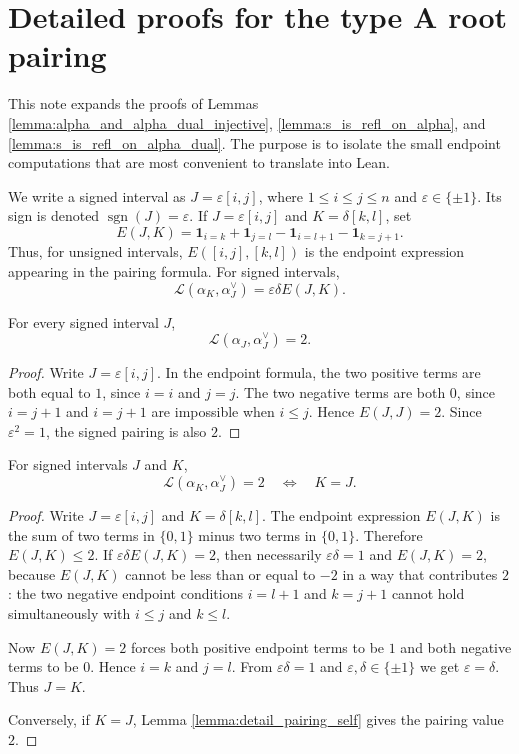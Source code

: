 
\section{Detailed proofs for the type A root pairing}

This note expands the proofs of Lemmas
\ref{lemma:alpha_and_alpha_dual_injective},
\ref{lemma:s_is_refl_on_alpha}, and
\ref{lemma:s_is_refl_on_alpha_dual}.  The purpose is to isolate the
small endpoint computations that are most convenient to translate into
Lean.

We write a signed interval as $J=\varepsilon [i,j]$, where
$1\le i\le j\le n$ and $\varepsilon\in\{\pm1\}$.  Its sign is denoted
$\operatorname{sgn}(J)=\varepsilon$.  If $J=\varepsilon[i,j]$ and
$K=\delta[k,l]$, set
\[
  E(J,K)
  =
  \mathbf{1}_{i=k}+\mathbf{1}_{j=l}
  -\mathbf{1}_{i=l+1}-\mathbf{1}_{k=j+1}.
\]
Thus, for unsigned intervals, $E([i,j],[k,l])$ is the endpoint expression
appearing in the pairing formula.  For signed intervals,
\[
  \mathcal L(\alpha_K,\alpha_J^\vee)
  =
  \varepsilon\delta E(J,K).
\]

\begin{lemma}\label{lemma:detail_pairing_self}
For every signed interval $J$,
\[
  \mathcal L(\alpha_J,\alpha_J^\vee)=2.
\]
\end{lemma}
\begin{proof}
Write $J=\varepsilon[i,j]$.  In the endpoint formula, the two positive
terms are both equal to $1$, since $i=i$ and $j=j$.  The two negative
terms are both $0$, since $i=j+1$ and $i=j+1$ are impossible when
$i\le j$.  Hence $E(J,J)=2$.  Since $\varepsilon^2=1$, the signed
pairing is also $2$.
\end{proof}

\begin{lemma}\label{lemma:detail_pairing_eq_two}
For signed intervals $J$ and $K$,
\[
  \mathcal L(\alpha_K,\alpha_J^\vee)=2
  \quad\Longleftrightarrow\quad
  K=J.
\]
\end{lemma}
\begin{proof}
Write $J=\varepsilon[i,j]$ and $K=\delta[k,l]$.  The endpoint expression
$E(J,K)$ is the sum of two terms in $\{0,1\}$ minus two terms in
$\{0,1\}$.  Therefore $E(J,K)\le 2$.  If
$\varepsilon\delta E(J,K)=2$, then necessarily
$\varepsilon\delta=1$ and $E(J,K)=2$, because $E(J,K)$ cannot be less
than or equal to $-2$ in a way that contributes $2$: the two negative
endpoint conditions $i=l+1$ and $k=j+1$ cannot hold simultaneously with
$i\le j$ and $k\le l$.

Now $E(J,K)=2$ forces both positive endpoint terms to be $1$ and both
negative terms to be $0$.  Hence $i=k$ and $j=l$.  From
$\varepsilon\delta=1$ and $\varepsilon,\delta\in\{\pm1\}$ we get
$\varepsilon=\delta$.  Thus $J=K$.

Conversely, if $K=J$, Lemma \ref{lemma:detail_pairing_self} gives the
pairing value $2$.
\end{proof}

